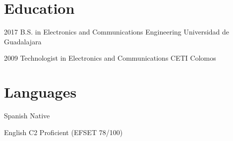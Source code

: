 \documentclass[10pt, letterpaper]{article} %
\begin{document}

\section{Education}

\dateitem
{2017}
{B.S. in Electronics and Communications Engineering}
{Universidad de Guadalajara}


\dateitem
{2009}
{Technologist in Electronics and Communications}
{CETI Colomos}


\section{Languages}

\langitem
{Spanish}
{Native}

\langitem
{English}
{C2 Proficient (EFSET 78/100)}

\end{document}
